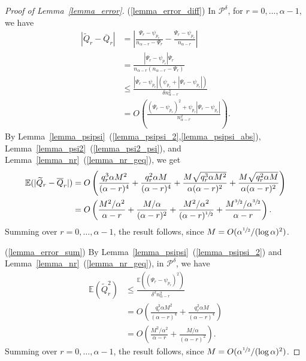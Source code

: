 \documentclass{article}
\theoremstyle{plain}
\theoremstyle{remark}
\theoremstyle{plain}
\numberwithin{equation}{section}
\begin{document}
	\begin{proof}[Proof of Lemma~\ref{lemma_error}]
		(\ref{lemma_error_diff}) In $\mathcal{P}^{\delta}$, for $r=0,\ldots,\alpha-1$, we have
		\begin{align}
			|\widetilde{Q}_r-\overline{Q}_r|
			&=\left|\frac{\Psi_r-\psi_{p_r}}{n_{\alpha-r}-\Psi_r}-\frac{\Psi_r-\psi_{p_r}}{n_{\alpha-r}}\right|
			\\&=\frac{|\Psi_r-\psi_{p_r}|\Psi_r}{n_{\alpha-r}(n_{\alpha-r}-\Psi_r)}
			\\&\leq\frac{|\Psi_r-\psi_{p_r}|(\psi_{p_r}+|\Psi_r-\psi_{p_r}|)}{\delta n_{\alpha-r}^2}
			\\&=O\left(\frac{(\Psi_r-\psi_{p_r})^2+\psi_{p_r}|\Psi_r-\psi_{p_r}|}{n_{\alpha-r}^2}\right).
		\end{align}
		By Lemma~\ref{lemma_psipsi}~(\ref{lemma_psipsi_2},\ref{lemma_psipsi_abs}), Lemma~\ref{lemma_psi2}~(\ref{lemma_psi2_psi}), and Lemma~\ref{lemma_nr}~(\ref{lemma_nr_geq}), we get
		\begin{align}
			\mathbb{E}(|\widetilde{Q}_r-\overline{Q}_r|)
			&=O\left(\frac{q_r^3\alpha M^2}{(\alpha-r)^4}+\frac{q_r^2\alpha M}{(\alpha-r)^4}+\frac{M\sqrt{q_r^3\alpha M^2}}{\alpha(\alpha-r)^2}+\frac{M\sqrt{q_r^2\alpha M}}{\alpha(\alpha-r)^2}\right)
			\\&=O\left(\frac{M^2/\alpha^2}{\alpha-r}+\frac{M/\alpha}{(\alpha-r)^2}+\frac{M^2/\alpha^2}{(\alpha-r)^{\sfrac12}}+\frac{M^{\sfrac32}/\alpha^{\sfrac32}}{\alpha-r}\right).
		\end{align}
		Summing over $r=0,\ldots,\alpha-1$, the result follows, since $M=O(\alpha^{\sfrac12}/(\log\alpha)^2)$.
		
		(\ref{lemma_error_sum}) By Lemma~\ref{lemma_psipsi}~(\ref{lemma_psipsi_2}) and Lemma~\ref{lemma_nr}~(\ref{lemma_nr_geq}), in $\mathcal{P}^{\delta}$, we have
		\begin{align}
			\mathbb{E}(\widetilde{Q}_r^2)
			&\leq\frac{\mathbb{E}((\Psi_r-\psi_{p_r})^2)}{\delta^2n_{\alpha-r}^2}
			\\&=O\left(\frac{q_r^3\alpha M^2}{(\alpha-r)^4}+\frac{q_r^2\alpha M}{(\alpha-r)^4}\right)
			\\&=O\left(\frac{M^2/\alpha^2}{\alpha-r}+\frac{M/\alpha}{(\alpha-r)^2}\right).
		\end{align}
		Summing over $r=0,\ldots,\alpha-1$, the result follows, since $M=O(\alpha^{\sfrac12}/(\log\alpha)^2)$.
		

\end{proof}
\end{document}
